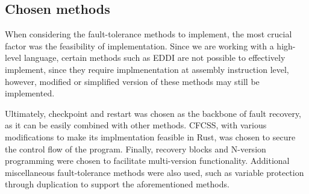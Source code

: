 \subsection{Chosen methods}

When considering the fault-tolerance methods to implement, the most crucial factor was the feasibility of implementation. Since we are working with a high-level language, certain methods such as EDDI are not possible to effectively implement, since they require implmenentation at assembly instruction level, however, modified or simplified version of these methods may still be implemented.

Ultimately, checkpoint and restart was chosen as the backbone of fault recovery, as it can be easily combined with other methods. CFCSS, with various modifications to make its implmentation feasible in Rust, was chosen to secure the control flow of the program. Finally, recovery blocks and N-version programming were chosen to facilitate multi-version functionality. Additional miscellaneous fault-tolerance methods were also used, such as variable protection through duplication to support the aforementioned methods.